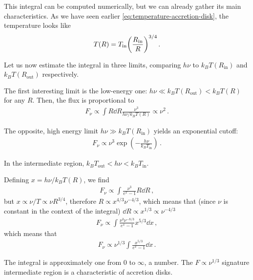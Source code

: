 \documentclass[main.tex]{subfiles}
\begin{document}
This integral can be computed numerically, but we can already gather its main characteristics. 
As we have seen earlier \eqref{eq:temperature-accretion-disk}, the temperature looks like 
%
\begin{align}
T(R) = T _{\text{in}} \qty( \frac{R _{\text{in}}}{R})^{3/4}
\,.
\end{align}

Let us now estimate the integral in three limits, comparing \(h \nu     \) to \(k_B T(R _{\text{in}})\) and \(k_B T (R _{\text{out}})\) respectively.

The first interesting limit is the low-energy one: \(h \nu \ll k_B T (R _{\text{out}}) < k_B T(R)\) for any \(R\).
Then, the flux is proportional to 
%
\begin{align}
F_\nu \propto \int R \dd{R} \frac{\nu^3}{h \nu / k_B T(R)} \propto \nu^2
\,.
\end{align}

The opposite, high energy limit \(h \nu \gg k_B T(R _{\text{in}})\) yields an exponential cutoff: 
%
\begin{align}
F_\nu \propto \nu^3 \exp(- \frac{h \nu }{k_B T _{\text{in}}})
\,.
\end{align}

In the intermediate region, \(k_B T _{\text{out}} < h \nu < k_B T _{\text{in}}\). 

Defining \(x = h \nu / k_B T(R)\), we find 
%
\begin{align}
F_\nu \propto \int \frac{\nu^3 }{e^{x} - 1} R \dd{R}
\,,
\end{align}
%
but \(x \propto \nu / T \propto \nu R^{3/4}\), therefore \(R \propto x^{4/3} \nu^{-4/3}\), which means that (since \(\nu \) is constant in the context of the integral) \(\dd{R} \propto x^{1/3} \propto \nu^{-4/3}\) 
%
\begin{align}
F_\nu \propto \int \frac{\nu^3 \nu^{-8/3}}{e^{x}-1} x^{5/3} \dd{x} 
\,,
\end{align}
%
which means that 
%
\begin{align}
F_\nu \propto \nu^{1/3} \int \frac{x^{5/3}}{e^{x}-1} \dd{x}
\,.
\end{align}

The integral is approximately one from 0 to \(\infty \), a number. 
The \(F \propto \nu^{1/3}\) signature intermediate region is a characteristic of accretion disks.  
\end{document}
